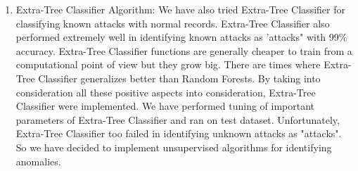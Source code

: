 \documentclass{acm_proc_article-sp}
\begin{document}
\begin{enumerate}
\item Extra-Tree Classifier Algorithm:
We have also tried Extra-Tree Classifier for classifying known attacks with normal records. Extra-Tree Classifier also performed extremely well in identifying known attacks as 'attacks" with 99\% accuracy. Extra-Tree Classifier functions are generally cheaper to train from a computational point of view but they grow big. There are times where Extra-Tree Classifier generalizes better than Random Forests. By taking into consideration all these positive aspects into consideration, Extra-Tree Classifier were implemented. We have performed tuning of important parameters of Extra-Tree Classifier and ran on test dataset. Unfortunately, Extra-Tree Classifier too failed in identifying unknown attacks as "attacks". So we have decided to implement unsupervised algorithms for identifying anomalies.
\end{enumerate}
\end{document}

